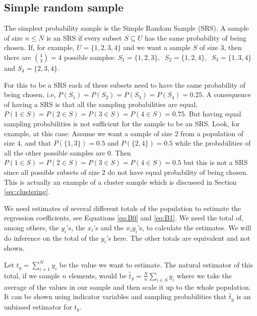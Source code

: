 \documentclass{article}
\begin{document}

\subsection{Simple random sample} \label{sec:SRS}

The simplest probability sample is the Simple Random Sample (SRS). A
sample of size \(n \leq N\) is an SRS if every subset \(S \subseteq U\) has the same
probability of being chosen.
If, for example, \(U = \{1, 2, 3, 4\}\) and we want a sample \(S\) of
size \(3\), then there are \(\binom{4}{3} = 4\)  possible samples:
\( S_1 = \{1, 2, 3\},\ \)
\( S_2 = \{1, 2, 4\},\ \)
\( S_3 = \{1, 3, 4\}\ \) and
\( S_4 = \{2, 3, 4\} \).

For this to be a SRS each of these subsets need to have the same probability of
being chosen, i.e, \(P(S_1) = P(S_2) = P(S_3) = P(S_4) = 0.25\). A consequence of
having a SRS is that all the sampling probabilities are equal, \(P(1 \in S) =
P(2 \in S) = P(3 \in S) = P(4 \in S) = 0.75\). But having equal sampling
probabilities is not sufficient for the sample to be an SRS.
Look, for example, at this case:
Assume we want a sample of size \(2\) from a population of size \(4\), and that
\(P(\{1, 3\}) = 0.5\) and \(P(\{2, 4\}) = 0.5\) while the probabilities of all the
other possible samples are \(0\). Then \(P(1 \in S) = P(2 \in S) = P(3 \in S) = P(4 \in S) = 0.5\)
but this is not a SRS since all possible subsets of size \(2\) do not have equal
probability of being chosen. This is actually an example of a cluster sample
which is discussed in Section \ref{sec:clustering}.

We need estimates of several different totals of the population to estimate the
regression coefficients, see Equations \ref{eq:B0} and \ref{eq:B1}. We need the total of, among others, the \(y_i\)'s, the
\(x_i\)'s and the \(x_i y_i\)'s, to calculate the estimates.
We will do inference on the total of the \(y_i\)'s here. The other totals
are equivalent and not shown.

Let
\(
 t_y = \sum_{i = 1}^{N} y_i
\)
be the value we want to estimate.
The natural estimator of this total, if we sample \(n\) elements, would be
\(
\hat{t}_y = \frac{N}{n}\sum_{i \in S} y_i
\)
where we take the average of the values in our sample and then scale it up to
the whole population.
It can be shown using indicator variables and sampling probabilities that
\(\hat{t}_y\) is an unbiased estimator for \(t_y\).
\end{document}
